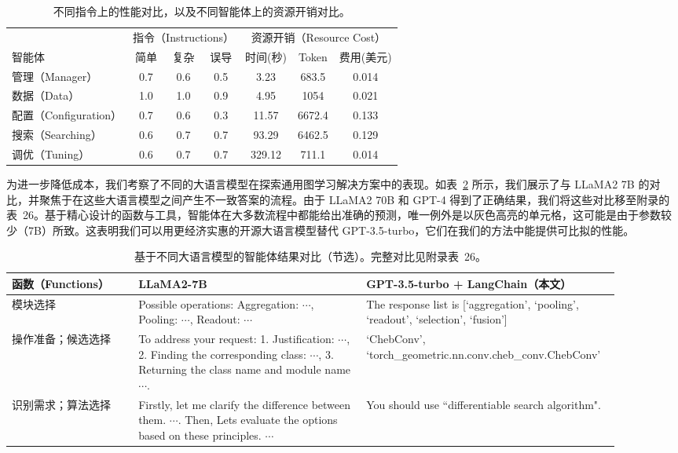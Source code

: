 \documentclass[11pt,UTF8,fontset=fandol]{ctexart}
\begin{document}
\begin{table}[H]\centering
\caption{不同指令上的性能对比，以及不同智能体上的资源开销对比。}
\label{tab:6}
\begin{tabular}{lccc|ccc}
\toprule
 & \multicolumn{3}{c|}{指令（Instructions）} & \multicolumn{3}{c}{资源开销（Resource Cost）} \\
智能体 & 简单 & 复杂 & 误导 & 时间(秒) & Token & 费用(美元) \\
\midrule
管理（Manager） & 0.7 & 0.6 & 0.5 & 3.23 & 683.5 & 0.014 \\
数据（Data） & 1.0 & 1.0 & 0.9 & 4.95 & 1054 & 0.021 \\
配置（Configuration） & 0.7 & 0.6 & 0.3 & 11.57 & 6672.4 & 0.133 \\
搜索（Searching） & 0.6 & 0.7 & 0.7 & 93.29 & 6462.5 & 0.129 \\
调优（Tuning） & 0.6 & 0.7 & 0.7 & 329.12 & 711.1 & 0.014 \\
\bottomrule
\end{tabular}
\end{table}

为进一步降低成本，我们考察了不同的大语言模型在探索通用图学习解决方案中的表现。如表~\ref{tab:7} 所示，我们展示了与 LLaMA2 7B 的对比，并聚焦于在这些大语言模型之间产生不一致答案的流程。由于 LLaMA2 70B 和 GPT-4 得到了正确结果，我们将这些对比移至附录的表~26。基于精心设计的函数与工具，智能体在大多数流程中都能给出准确的预测，唯一例外是以灰色高亮的单元格，这可能是由于参数较少（7B）所致。这表明我们可以用更经济实惠的开源大语言模型替代 GPT-3.5-turbo，它们在我们的方法中能提供可比拟的性能。

\begin{table}[H]\centering
\caption{基于不同大语言模型的智能体结果对比（节选）。完整对比见附录表~26。}
\label{tab:7}
\renewcommand{\arraystretch}{1.3}
\begin{tabular}{p{0.20\linewidth} p{0.36\linewidth} p{0.34\linewidth}}
\toprule
函数（Functions） & LLaMA2-7B & GPT-3.5-turbo + LangChain（本文） \\
\midrule
模块选择 & Possible operations: Aggregation: $\cdots$, Pooling: $\cdots$, Readout: $\cdots$ & The response list is [`aggregation', `pooling', `readout', `selection', `fusion'] \\
操作准备；候选选择 & To address your request: 1. Justification: $\cdots$, 2. Finding the corresponding class: $\cdots$, 3. Returning the class name and module name $\cdots$. & `ChebConv', `torch\_geometric.nn.conv.cheb\_conv.ChebConv' \\
识别需求；算法选择 & Firstly, let me clarify the difference between them. $\cdots$. Then, Lets evaluate the options based on these principles. $\cdots$ & You should use ``differentiable search algorithm". \\
\bottomrule
\end{tabular}
\end{table}
\end{document}
